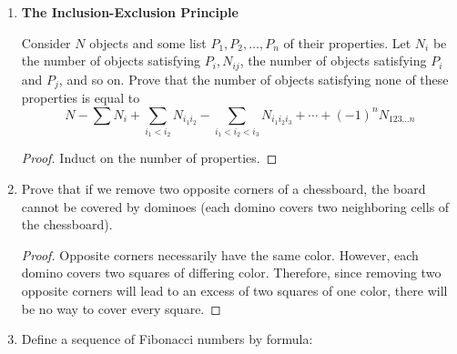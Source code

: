 \documentclass[../main.tex]{subfiles}
\begin{document}
\begin{enumerate}
\begin{enumerate}
\begin{proof}
            \begin{align*}
                g_1g_2 &= eg_1g_2e\tag*{Identity}\\
                &= (g_1^{-1}g_1)(g_1g_2)(g_2g_2^{-1})\tag*{Inverse}\\
                &= g_1^{-1}g_1^2g_2^2g_2^{-1}\tag*{Associativity}\\
                &= g_1^{-1}eeg_2^{-1}\tag*{Property}\\
                &= g_1^{-1}g_2^{-1}\tag*{Identity}\\
                &= (g_2g_1)^{-1}\tag*{Part (a)}\\
                &= (g_2g_1)^{-1}e\tag*{Identity}\\
                &= (g_2g_1)^{-1}(g_2g_1)^{-1}(g_2g_1)\tag*{Inverse}\\
                &= eg_2g_1\tag*{Property}\\
                &= g_2g_1\tag*{Identity}
            \end{align*}
            as desired.
        \end{proof}
    \end{enumerate}
    \item \textbf{The Inclusion-Exclusion Principle}\par
    Consider $N$ objects and some list $P_1,P_2,\dots,P_n$ of their properties. Let $N_i$ be the number of objects satisfying $P_i,N_{ij}$, the number of objects satisfying $P_i$ and $P_j$, and so on. Prove that the number of objects satisfying none of these properties is equal to
    \begin{equation*}
        N-\sum N_i+\sum_{i_1<i_2}N_{i_1i_2}-\sum_{i_1<i_2<i_3}N_{i_1i_2i_3}+\cdots+(-1)^nN_{123\dots n}
    \end{equation*}
    \begin{proof}
        Induct on the number of properties.
    \end{proof}
    \item Prove that if we remove two opposite corners of a chessboard, the board cannot be covered by dominoes (each domino covers two neighboring cells of the chessboard).
    \begin{proof}
        Opposite corners necessarily have the same color. However, each domino covers two squares of differing color. Therefore, since removing two opposite corners will lead to an excess of two squares of one color, there will be no way to cover every square.
    \end{proof}
    \item Define a sequence of Fibonacci numbers by formula:

\end{enumerate}
\end{document}

